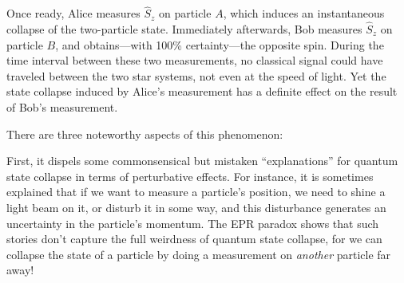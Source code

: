 \documentclass[pra,12pt]{revtex4}
\begin{document}
Once ready, Alice measures $\hat{S}_z$ on particle $A$, which induces
an instantaneous collapse of the two-particle state.  Immediately
afterwards, Bob measures $\hat{S}_z$ on particle $B$, and
obtains---with 100\% certainty---the opposite spin.  During the time
interval between these two measurements, no classical signal could
have traveled between the two star systems, not even at the speed of
light.  Yet the state collapse induced by Alice's measurement has a
definite effect on the result of Bob's measurement.

There are three noteworthy aspects of this phenomenon:

First, it dispels some commonsensical but mistaken ``explanations''
for quantum state collapse in terms of perturbative effects.  For
instance, it is sometimes explained that if we want to measure a
particle's position, we need to shine a light beam on it, or disturb
it in some way, and this disturbance generates an uncertainty in the
particle's momentum.  The EPR paradox shows that such stories don't
capture the full weirdness of quantum state collapse, for we can
collapse the state of a particle by doing a measurement on
\textit{another} particle far away!
\end{document}
